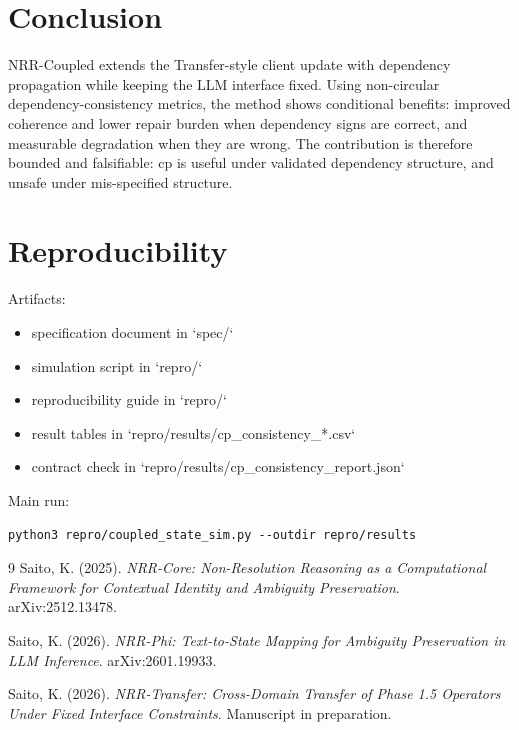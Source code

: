 \documentclass[11pt,a4paper]{article}
\begin{document}
\section{Conclusion}
NRR-Coupled extends the Transfer-style client update with dependency propagation while keeping the LLM interface fixed. Using non-circular dependency-consistency metrics, the method shows conditional benefits: improved coherence and lower repair burden when dependency signs are correct, and measurable degradation when they are wrong. The contribution is therefore bounded and falsifiable: cp is useful under validated dependency structure, and unsafe under mis-specified structure.

\section{Reproducibility}
Artifacts:
\begin{itemize}
  \item specification document in `spec/`
  \item simulation script in `repro/`
  \item reproducibility guide in `repro/`
  \item result tables in `repro/results/cp\_consistency\_*.csv`
  \item contract check in `repro/results/cp\_consistency\_report.json`
\end{itemize}

Main run:
\begin{lstlisting}
python3 repro/coupled_state_sim.py --outdir repro/results
\end{lstlisting}

\begin{thebibliography}{9}
Saito, K. (2025).
\textit{NRR-Core: Non-Resolution Reasoning as a Computational Framework for Contextual Identity and Ambiguity Preservation}.
arXiv:2512.13478.

Saito, K. (2026).
\textit{NRR-Phi: Text-to-State Mapping for Ambiguity Preservation in LLM Inference}.
arXiv:2601.19933.

Saito, K. (2026).
\textit{NRR-Transfer: Cross-Domain Transfer of Phase 1.5 Operators Under Fixed Interface Constraints}.
Manuscript in preparation.
\end{thebibliography}
\end{document}
